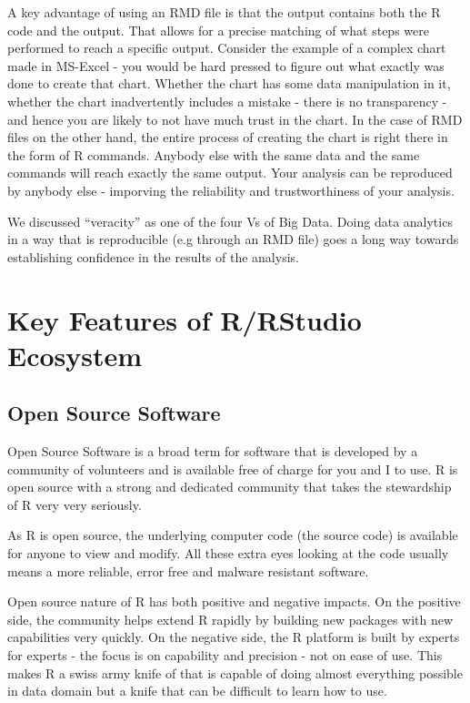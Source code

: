 \documentclass[]{krantz}
\theoremstyle{definition}
\theoremstyle{definition}
\theoremstyle{definition}
\theoremstyle{remark}
\begin{document}
A key advantage of using an RMD file is that the output contains both
the R code and the output. That allows for a precise matching of what
steps were performed to reach a specific output. Consider the example of
a complex chart made in MS-Excel - you would be hard pressed to figure
out what exactly was done to create that chart. Whether the chart has
some data manipulation in it, whether the chart inadvertently includes a
mistake - there is no transparency - and hence you are likely to not
have much trust in the chart. In the case of RMD files on the other
hand, the entire process of creating the chart is right there in the
form of R commands. Anybody else with the same data and the same
commands will reach exactly the same output. Your analysis can be
reproduced by anybody else - imporving the reliability and
trustworthiness of your analysis.

We discussed ``veracity'' as one of the four Vs of Big Data. Doing data
analytics in a way that is reproducible (e.g through an RMD file) goes a
long way towards establishing confidence in the results of the analysis.

\section{Key Features of R/RStudio
Ecosystem}\label{key-features-of-rrstudio-ecosystem}

\subsection{Open Source Software}\label{open-source-software}

Open Source Software is a broad term for software that is developed by a
community of volunteers and is available free of charge for you and I to
use. R is open source with a strong and dedicated community that takes
the stewardship of R very very seriously.

As R is open source, the underlying computer code (the source code) is
available for anyone to view and modify. All these extra eyes looking at
the code usually means a more reliable, error free and malware resistant
software.

Open source nature of R has both positive and negative impacts. On the
positive side, the community helps extend R rapidly by building new
packages with new capabilities very quickly. On the negative side, the R
platform is built by experts for experts - the focus is on capability
and precision - not on ease of use. This makes R a swiss army knife of
that is capable of doing almost everything possible in data domain but a
knife that can be difficult to learn how to use.
\end{document}
